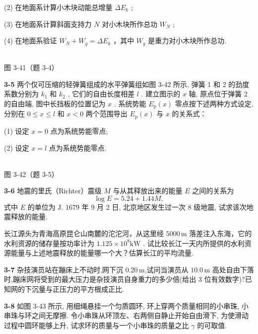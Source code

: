 (2) 在地面系计算小木块动能总增量 $\Delta E_{k}$ ;

(3) 在地面系计算斜面支持力 $N$ 对小木块所作总功 $W_{N}$ ;

(4) 在地面系验证 $W_{N} + W_{g} = \Delta E_{k}$ ，其中 $W_{g}$ 是重力对小木块所作总功.

\begin{center}
\resizebox{0.50\textwidth}{!}{}\\[4pt]
{\small 图 3-41（题 3-4）}
\end{center}

\newpage

\textbf{3-5} 两个仅可压缩的轻弹簧组成的水平弹簧组如图 3-42 所示, 弹簧 1 和 2 的劲度系数分别为 $k_{1}$ 和 $k_{2}$ , 它们的自由长度相差 $l$ . 建立图示的 $x$ 轴, 原点位于弹簧 2 的自由端, 图中长挡板的位置记为 $x$ . 系统势能 $E_{\mathrm{p}}(x)$ 零点按下述两种方式设定, 分别在 $0 \leqslant x \leqslant l$ 和 $x < 0$ 两个范围导出 $E_{\mathrm{p}}(x)$ 与 $x$ 的关系式：

(1) 设定 $x = 0$ 点为系统势能零点; 

(2) 设定 $x = l$ 点为系统势能零点.

\begin{center}
\resizebox{0.50\textwidth}{!}{}\\[4pt]
{\small 图 3-42（题 3-5）}
\end{center}

\newpage

\textbf{3-6} 地震的里氏（Richter）震级 $M$ 与从其释放出来的能量 $E$ 之间的关系为
\[
\log E = 5.24 + 1.44M,
\]
式中 $E$ 的单位为 $\mathrm{J}$. 1679 年 9 月 2 日, 北京地区发生过一次 8 级地震, 试求该次地震释放的能量.

长江源头为青海高原昆仑山南麓的沱沱河，从这里经 $5000\,\mathrm{m}$ 落差注入东海，它的水利资源的储存量按功率计为 $1.125 \times 10^{8} \mathrm{kW}$ . 试比较长江一天内所提供的水利资源能量与上述地震释放的能量哪一个大？估算长江的平均流量.

\newpage

\textbf{3-7} 杂技演员站在蹦床上不动时,网下沉 $0.20\,\mathrm{m}$,试问当演员从 $10.0\,\mathrm{m}$ 高处自由下落时,蹦床网将受到的最大压力是杂技演员自身重力的多少倍(给出 3 位有效数字)?已知网的下沉量与正压力的平方根成正比.

\newpage

\textbf{3-8} 如图 3-43 所示, 用细绳悬挂一个匀质圆环, 环上穿两个质量相同的小串珠, 小串珠与环之间无摩擦. 令小串珠从环顶左、右两侧自静止开始自由滑下, 为使滑动过程中圆环能够上升, 试求环的质量与一个小串珠的质量之比 $\gamma$ 的可取值.

